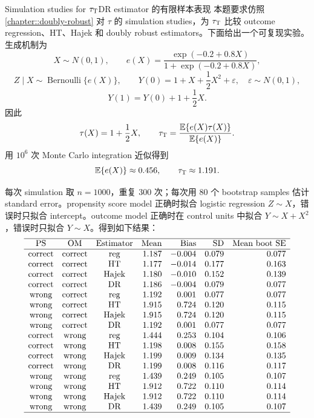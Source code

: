 \begin{exercisesolution}{Simulation studies for $\tau_\textsc{T}$}{DR estimator 的有限样本表现}
本题要求仿照 \cref{chapter::doubly-robust} 对 $\tau$ 的 simulation studies，为 $\tau_\textsc{T}$ 比较 outcome regression、HT、Hajek 和 doubly robust estimators。下面给出一个可复现实验。生成机制为
\[
X\sim N(0,1),\qquad e(X)=\frac{\exp(-0.2+0.8X)}{1+\exp(-0.2+0.8X)},
\]
\[
Z\mid X\sim \operatorname{Bernoulli}\{e(X)\},
\qquad
Y(0)=1+X+\frac{1}{2}X^2+\varepsilon,\quad \varepsilon\sim N(0,1),
\]
\[
Y(1)=Y(0)+1+\frac{1}{2}X.
\]
因此
\[
\tau(X)=1+\frac{1}{2}X,\qquad
\tau_\textsc{T}=\frac{\mathbb{E}\{e(X)\tau(X)\}}{\mathbb{E}\{e(X)\}}.
\]
用 $10^6$ 次 Monte Carlo integration 近似得到
\[
\mathbb{E}\{e(X)\}\approx 0.456,\qquad
\tau_\textsc{T}\approx 1.191.
\]

每次 simulation 取 $n=1000$，重复 $300$ 次；每次用 $80$ 个 bootstrap samples 估计 standard error。propensity score model 正确时拟合 logistic regression $Z\sim X$，错误时只拟合 intercept。outcome model 正确时在 control units 中拟合 $Y\sim X+X^2$，错误时只拟合 $Y\sim X$。得到如下结果：
\[
\begin{array}{cccrrrr}
\hline
\text{PS} & \text{OM} & \text{Estimator} & \text{Mean} & \text{Bias} & \text{SD} & \text{Mean boot SE}\\
\hline
\text{correct} & \text{correct} & \text{reg}   & 1.187 & -0.004 & 0.079 & 0.077\\
\text{correct} & \text{correct} & \text{HT}    & 1.177 & -0.014 & 0.177 & 0.163\\
\text{correct} & \text{correct} & \text{Hajek} & 1.180 & -0.010 & 0.152 & 0.139\\
\text{correct} & \text{correct} & \text{DR}    & 1.186 & -0.004 & 0.079 & 0.077\\
\text{wrong} & \text{correct} & \text{reg}   & 1.192 &  0.001 & 0.077 & 0.077\\
\text{wrong} & \text{correct} & \text{HT}    & 1.915 &  0.724 & 0.120 & 0.115\\
\text{wrong} & \text{correct} & \text{Hajek} & 1.915 &  0.724 & 0.120 & 0.115\\
\text{wrong} & \text{correct} & \text{DR}    & 1.192 &  0.001 & 0.077 & 0.077\\
\text{correct} & \text{wrong} & \text{reg}   & 1.444 &  0.253 & 0.104 & 0.106\\
\text{correct} & \text{wrong} & \text{HT}    & 1.198 &  0.008 & 0.155 & 0.158\\
\text{correct} & \text{wrong} & \text{Hajek} & 1.199 &  0.009 & 0.134 & 0.135\\
\text{correct} & \text{wrong} & \text{DR}    & 1.199 &  0.008 & 0.116 & 0.117\\
\text{wrong} & \text{wrong} & \text{reg}   & 1.439 &  0.249 & 0.105 & 0.107\\
\text{wrong} & \text{wrong} & \text{HT}    & 1.912 &  0.722 & 0.110 & 0.114\\
\text{wrong} & \text{wrong} & \text{Hajek} & 1.912 &  0.722 & 0.110 & 0.114\\
\text{wrong} & \text{wrong} & \text{DR}    & 1.439 &  0.249 & 0.105 & 0.107\\
\hline
\end{array}
\]


\end{exercisesolution}
